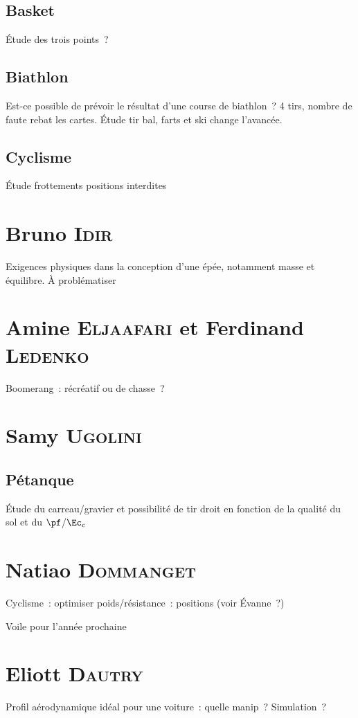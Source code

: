 \documentclass[a4paper, 11pt, final, garamond]{book}
\begin{document}
\subsection{Basket}
Étude des trois points~?

\subsection{Biathlon}
Est-ce possible de prévoir le résultat d'une course de biathlon~? 4 tirs, nombre
de faute rebat les cartes. Étude tir bal, farts et ski change l'avancée.

\subsection{Cyclisme}
Étude frottements positions interdites

\section{Bruno \textsc{Idir}}
Exigences physiques dans la conception d'une épée, notamment masse et équilibre.
À problématiser

\section{Amine \textsc{Eljaafari} et Ferdinand \textsc{Ledenko}}
Boomerang~: récréatif ou de chasse~?

\section{Samy \textsc{Ugolini}}
\subsection{Pétanque}
Étude du carreau/gravier et possibilité de tir droit en fonction de la qualité
du sol et du $\pf$/$\Ec_c$

\section{Natiao \textsc{Dommanget}}
Cyclisme~: optimiser poids/résistance~: positions (voir Évanne~?)

Voile pour l'année prochaine

\section{Eliott \textsc{Dautry}}
Profil aérodynamique idéal pour une voiture~: quelle manip~? Simulation~?
\end{document}
